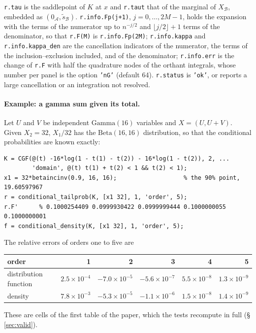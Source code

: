 \documentclass[11pt]{article}
\newcommand{\prog}[1]{\texttt{#1}}
\begin{document}
\prog{r.tau} is the saddlepoint of $K$ at $x$ and \prog{r.taut} that of the marginal of
$X_{\mathcal B}$, embedded as $(0_{\mathcal A},\tilde s_{\mathcal B})$. \prog{r.info.Fp(j+1)},
$j=0,\ldots,2M-1$, holds the expansion with the terms of the numerator up to $n^{-j/2}$ and
$\lfloor j/2\rfloor+1$ terms of the denominator, so that \prog{r.F(M)} is \prog{r.info.Fp(2M)};
\prog{r.info.kappa} and \prog{r.info.kappa\_den} are the cancellation indicators of the numerator,
the terms of the inclusion--exclusion included, and of the denominator; \prog{r.info.err} is the
change of \prog{r.F} with half the quadrature nodes of the orthant integrals, whose number per panel
is the option \prog{'nG'} (default 64). \prog{r.status} is \prog{'ok'}, or reports a large
cancellation or an integration not resolved.

\paragraph{Example: a gamma sum given its total.} Let $U$ and $V$ be independent
$\mathrm{Gamma}(16)$ variables and $X=(U,U+V)$. Given $X_2=32$, $X_1/32$ has the
$\mathrm{Beta}(16,16)$ distribution, so that the conditional probabilities are known exactly:
\begin{lstlisting}
K = CGF(@(t) -16*log(1 - t(1) - t(2)) - 16*log(1 - t(2)), 2, ...
        'domain', @(t) t(1) + t(2) < 1 && t(2) < 1);
x1 = 32*betaincinv(0.9, 16, 16);                   % the 90% point, 19.60597967
r = conditional_tailprob(K, [x1 32], 1, 'order', 5);
r.F'      % 0.1000254409 0.0999930422 0.0999999444 0.1000000055 0.1000000001
f = conditional_density(K, [x1 32], 1, 'order', 5);
\end{lstlisting}
The relative errors of orders one to five are
\begin{center}
\begin{tabular}{lrrrrr}
\toprule
order & 1 & 2 & 3 & 4 & 5\\
\midrule
distribution function & $2.5\times10^{-4}$ & $-7.0\times10^{-5}$ & $-5.6\times10^{-7}$ & $5.5\times10^{-8}$ & $1.3\times10^{-9}$\\
density & $7.8\times10^{-3}$ & $-5.3\times10^{-5}$ & $-1.1\times10^{-6}$ & $1.5\times10^{-8}$ & $1.4\times10^{-9}$\\
\bottomrule
\end{tabular}
\end{center}
These are cells of the first table of the paper, which the tests recompute in full
(\S\,\ref{sec:valid}).
\end{document}
